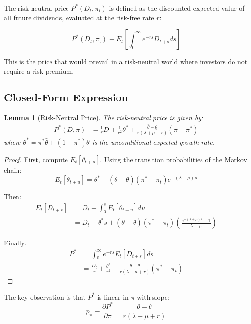 \documentclass[12pt]{article}
\newtheorem{lemma}{Lemma}
\begin{document}
The risk-neutral price $P^*(D_t, \pi_t)$ is defined as the discounted expected value of all future dividends, evaluated at the risk-free rate $r$:

\begin{equation}
P^*(D_t, \pi_t) \equiv E_t\left[\int_0^\infty e^{-rs} D_{t+s} ds\right]
\end{equation}

This is the price that would prevail in a risk-neutral world where investors do not require a risk premium.

\subsection{Closed-Form Expression}

\begin{lemma}[Risk-Neutral Price]
The risk-neutral price is given by:
\begin{align}
P^*(D, \pi) &= \frac{1}{r}D + \frac{1}{r^2}\theta^* + \frac{\bar{\theta} - \underline{\theta}}{r(\lambda + \mu + r)}(\pi - \pi^*) \label{eq:risk_neutral}
\end{align}
where $\theta^* = \pi^*\bar{\theta} + (1-\pi^*)\underline{\theta}$ is the unconditional expected growth rate.
\end{lemma}

\begin{proof}
First, compute $E_t[\theta_{t+u}]$. Using the transition probabilities of the Markov chain:
\begin{equation}
E_t[\theta_{t+u}] = \theta^* - (\bar{\theta} - \underline{\theta})(\pi^* - \pi_t)e^{-(\lambda+\mu)u}
\end{equation}

Then:
\begin{align}
E_t[D_{t+s}] &= D_t + \int_0^s E_t[\theta_{t+u}]du \\
&= D_t + \theta^* s + (\bar{\theta} - \underline{\theta})(\pi^* - \pi_t)\left(\frac{e^{-(\lambda+\mu)s} - 1}{\lambda + \mu}\right)
\end{align}

Finally:
\begin{align}
P^* &= \int_0^\infty e^{-rs} E_t[D_{t+s}]ds \\
&= \frac{D_t}{r} + \frac{\theta^*}{r^2} - \frac{\bar{\theta} - \underline{\theta}}{r(\lambda + \mu + r)}(\pi^* - \pi_t)
\end{align}
\end{proof}

The key observation is that $P^*$ is linear in $\pi$ with slope:
\begin{equation}
p_\pi \equiv \frac{\partial P^*}{\partial \pi} = \frac{\bar{\theta} - \underline{\theta}}{r(\lambda + \mu + r)} \label{eq:p_pi}
\end{equation}
\end{document}
